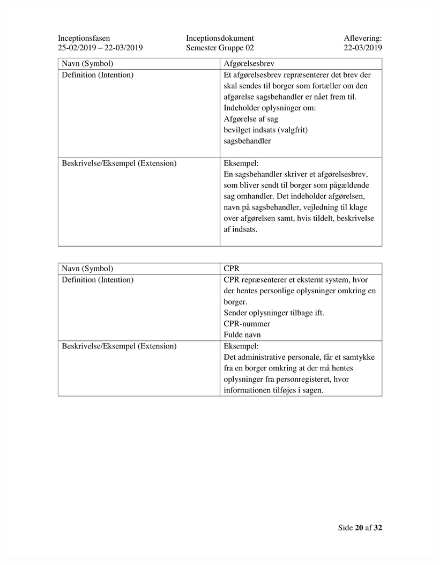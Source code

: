 \begin{figure}[hb]
  \includegraphics[scale = 0.33]{./PNG/Inceptions/Gruppe02+InceptionsDokument-21.jpg} 
\end{figure}

